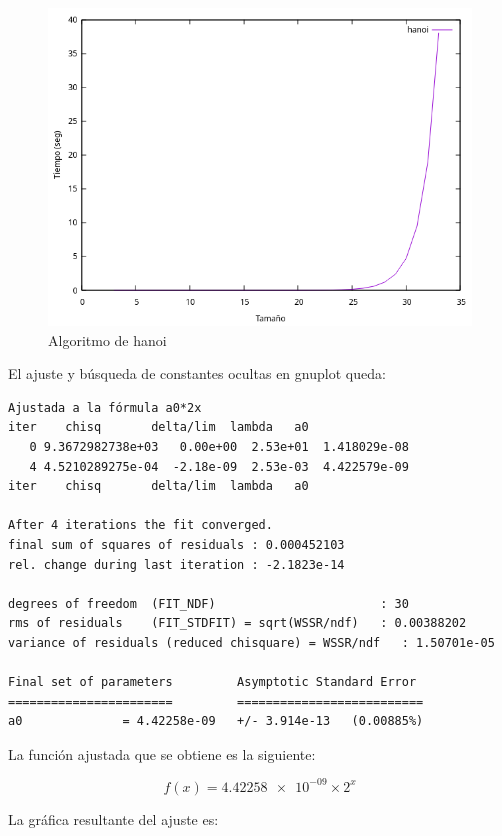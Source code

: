\documentclass[12pt, spanish]{article}
\begin{document}
\begin{figure}[H]
  \centering
  \includegraphics[scale = 0.7]{hanoi.png}
  \caption{Algoritmo de hanoi}
\end{figure}

El ajuste y búsqueda de constantes ocultas en gnuplot queda:

\begin{verbatim}
Ajustada a la fórmula a0*2x
iter  	chisq   	delta/lim  lambda   a0
   0 9.3672982738e+03   0.00e+00  2.53e+01	1.418029e-08
   4 4.5210289275e-04  -2.18e-09  2.53e-03	4.422579e-09
iter  	chisq   	delta/lim  lambda   a0

After 4 iterations the fit converged.
final sum of squares of residuals : 0.000452103
rel. change during last iteration : -2.1823e-14

degrees of freedom	(FIT_NDF)                    	: 30
rms of residuals  	(FIT_STDFIT) = sqrt(WSSR/ndf)	: 0.00388202
variance of residuals (reduced chisquare) = WSSR/ndf   : 1.50701e-05

Final set of parameters        	Asymptotic Standard Error
=======================        	==========================
a0          	= 4.42258e-09  	+/- 3.914e-13	(0.00885%)
\end{verbatim}

\newpage
La función ajustada que se obtiene es la siguiente:

\[ f(x)= \num{4.42258e-09} \times 2^x \]


La gráfica resultante del ajuste es:
\end{document}
